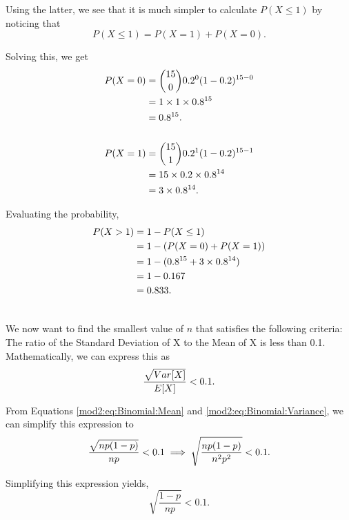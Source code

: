 \begin{subquestions}
\begin{subsubquestions}
Using the latter, we see that it is much simpler to calculate $P(X\leq1) $   by noticing that 
\begin{equation}
	P(X \leq 1)  =  P(X=1)+P(X=0). 
\end{equation}

Solving this, we get
\begin{align}
	P(X=0)&={ 15 \choose 0} 0.2^0 (1-0.2)^{15-0} \nonumber \\
	&=1\times1\times0.8^{15} \nonumber \\
	&=0.8^{15}.\nonumber \\ \nonumber \\
	P(X=1)&={ 15 \choose 1} 0.2^1 (1-0.2)^{15-1} \nonumber \\
	&=15 \times 0.2 \times 0.8^{14} \nonumber \\
	&=3\times 0.8^{14}. 
\end{align}

Evaluating the probability,
\begin{align}
	P(X>1)&=1-P(X\leq1) \nonumber \\
	&=1-(P(X=0)+P(X=1)) \nonumber \\
	&=1-(0.8^{15}+3\times0.8^{14}) \nonumber \\
	&=1- 0.167 \nonumber \\
	&=0.833. \\ \nonumber
\end{align}



\subsubquestion
We now want to find the smallest value of $n$ that satisfies the following criteria: \\The ratio of the Standard Deviation of X to the Mean of X is less than 0.1.\\

Mathematically, we can express this as
\begin{equation}
	\frac{\sqrt{Var[X]}}{E[X]}< 0.1.  \\ 
\end{equation}

From Equations \ref{mod2:eq:Binomial:Mean} and \ref{mod2:eq:Binomial:Variance}, we can simplify this expression to
\begin{equation}
	\frac{\sqrt{np(1-p)}}{np}<0.1 \implies \sqrt{\frac{np(1-p)}{n^2p^2}}<0.1.  \\ 
\end{equation}

Simplifying this expression yields,
\begin{equation}
	\sqrt{\frac{1-p}{np}}<0.1.
\end{equation}


\end{subsubquestions}
\end{subquestions}
